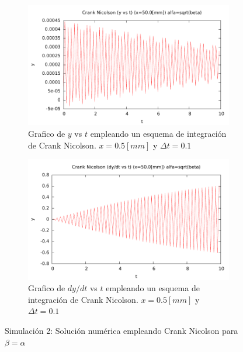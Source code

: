 

\begin{center}
\begin{figure} [H]
	\begin{subfigure}[b]{0.8\textwidth}
		\includegraphics{./parte3/graficos/grafico_cn_S2_y_b1.pdf}
		\caption{Grafico de $y$ vs $t$ empleando un esquema de integración de Crank Nicolson. $x=0.5[mm]$ y $\Delta t=0.1$}  
		\label{fig:cnS2b1_y}
	\end{subfigure}
	
	\begin{subfigure}[b]{0.3\textwidth}
		\includegraphics{./parte3/graficos/grafico_cn_S2_dy_b1.pdf}
		\caption{Grafico de $dy/dt$ vs $t$ empleando un esquema de integración de Crank Nicolson. $x=0.5[mm]$ y $\Delta t=0.1$}   
		\label{fig:cnS2b1_dy}
	\end{subfigure}
\caption{Simulación 2: Solución numérica empleando Crank Nicolson para $\beta=\alpha$}
\end{figure}
\end{center}

